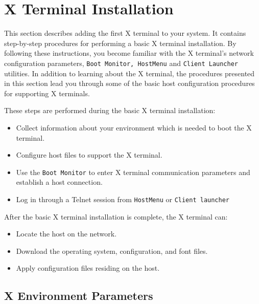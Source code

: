 \documentclass[11pt]{article}
\begin{document}
\section {X Terminal Installation}

This section describes adding the first X terminal to your system. It contains
step-by-step procedures for performing a basic X terminal installation. By
following these instructions, you become familiar with the X terminal's network
configuration parameters, {\tt Boot Monitor, HostMenu} and {\tt Client Launcher}
utilities. In addition to learning about the X terminal, the procedures
presented in this section lead you through some of the basic host configuration
procedures for supporting X terminals.

These steps are performed during the basic X terminal installation:

\begin {itemize}

\item Collect information about your environment which is needed to boot the
X terminal.

\item Configure host files to support the X terminal.

\item Use the {\tt Boot Monitor} to enter X terminal communication parameters
and establish a host connection.

\item Log in through a Telnet session from {\tt HostMenu} or
{\tt Client launcher}

\end {itemize}

After the basic X terminal installation is complete, the X terminal can:

\begin {itemize}

\item Locate the host on the network.

\item Download the operating system, configuration, and font files.

\item Apply configuration files residing on the host.

\end {itemize}


\subsection {X Environment Parameters}
\end{document}
